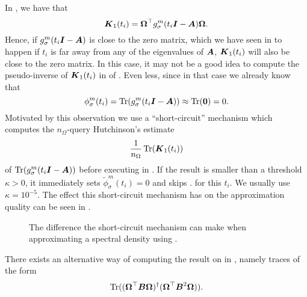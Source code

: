In , we have that
\begin{equation}
    \boldsymbol{K}_1(t_i) = \boldsymbol{\Omega}^{\top} g_{\sigma}^m(t_i\boldsymbol{I} - \boldsymbol{A}) \boldsymbol{\Omega}.
    \label{equ:3-nystrom-interpolated-matrix}
\end{equation}
Hence, if $g_{\sigma}^m(t_i\boldsymbol{I} - \boldsymbol{A})$ is close to the zero matrix,
which we have seen in  to happen if
$t_i$ is far away from any of the eigenvalues of $\boldsymbol{A}$, $\boldsymbol{K}_1(t_i)$ will
also be close to the zero matrix. In this case, it may not be a good idea to
compute the pseudo-inverse of $\boldsymbol{K}_1(t_i)$ in 
of . Even less, since in that case we already know that
\begin{equation}
    \phi_{\sigma}^m(t_i) = \operatorname{Tr}(g_{\sigma}^m(t_i\boldsymbol{I} - \boldsymbol{A})) \approx \operatorname{Tr}(\boldsymbol{0}) = 0.
    \label{equ:3-nystrom-short-circuit}
\end{equation}
Motivated by this observation we use a \enquote{short-circuit} mechanism which 
computes the $n_{\Omega}$-query Hutchinson's estimate 
\begin{equation}
    \frac{1}{n_{\Omega}} \operatorname{Tr}(\boldsymbol{K}_1(t_i))
    \label{equ:3-nystrom-short-circuit-hutchinson}
\end{equation}
of $\operatorname{Tr}(g_{\sigma}^m(t_i\boldsymbol{I} - \boldsymbol{A}))$
before executing  in .
If the result is smaller than a threshold $\kappa > 0$, it immediately sets
$\widetilde{\phi}_{\sigma}^m(t_i)=0$ and skips .
for this $t_i$. We usually use $\kappa = 10^{-5}$. The effect this short-circuit
mechanism has on the approximation quality can be seen in .\\

\begin{figure}[ht]
    \centering
    
    \caption{The difference the short-circuit mechanism can make when approximating
        a spectral density using .}
    \label{fig:3-nystrom-short-circuit-mechanism}
\end{figure}

There exists an alternative way of computing the result on 
in , namely traces of the form
\begin{equation}
    \operatorname{Tr}((\boldsymbol{\Omega}^{\top} \boldsymbol{B} \boldsymbol{\Omega})^{\dagger}(\boldsymbol{\Omega}^{\top} \boldsymbol{B}^2 \boldsymbol{\Omega})).
    \label{equ:3-nystrom-trace-pseudo-inverse}
\end{equation}

